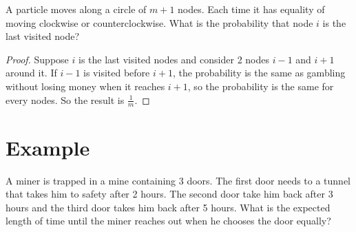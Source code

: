 \begin{example}
A particle moves along a circle of $m+1$ nodes. Each time it has equality of moving clockwise or counterclockwise. What is the probability that node $i$ is the last visited node?    
\end{example}
\begin{proof}
    Suppose $i$ is the last visited nodes and consider 2 nodes $i-1$ and $i+1$ around it. If $i-1$ is visited before $i+1$, the probability is the same as gambling without losing money when it reaches $i+1$, so the probability is the same for every nodes. So the result is $\displaystyle \frac{1}{m}$.
\end{proof}



\section{Example}

\begin{example}
    A miner is trapped in a mine containing 3 doors. The first door needs to a tunnel that takes him to safety after 2 hours. The second door take him back after 3 hours and the third door takes him back after 5 hours. What is the expected length of time until the miner reaches out when he chooses the door equally?
\end{example}

